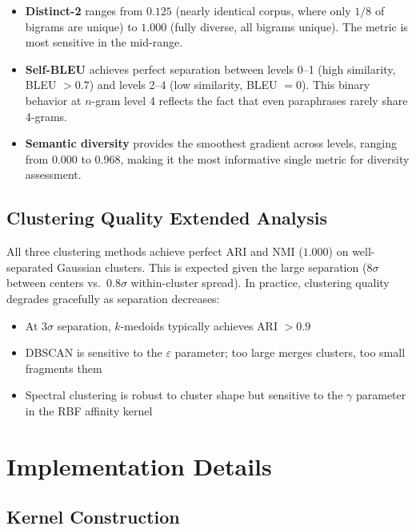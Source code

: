 \documentclass[11pt]{article}
\begin{document}
\begin{itemize}[leftmargin=*]
\item \textbf{Distinct-2} ranges from $0.125$ (nearly identical corpus, where
  only $1/8$ of bigrams are unique) to $1.000$ (fully diverse, all bigrams
  unique). The metric is most sensitive in the mid-range.
\item \textbf{Self-BLEU} achieves perfect separation between levels 0--1
  (high similarity, BLEU $> 0.7$) and levels 2--4 (low similarity, BLEU $= 0$).
  This binary behavior at $n$-gram level 4 reflects the fact that even
  paraphrases rarely share 4-grams.
\item \textbf{Semantic diversity} provides the smoothest gradient across
  levels, ranging from $0.000$ to $0.968$, making it the most informative
  single metric for diversity assessment.
\end{itemize}

\subsection{Clustering Quality Extended Analysis}

All three clustering methods achieve perfect ARI and NMI ($1.000$) on
well-separated Gaussian clusters. This is expected given the large separation
($8\sigma$ between centers vs.\ $0.8\sigma$ within-cluster spread). In
practice, clustering quality degrades gracefully as separation decreases:

\begin{itemize}[leftmargin=*]
\item At $3\sigma$ separation, $k$-medoids typically achieves ARI $> 0.9$
\item DBSCAN is sensitive to the $\varepsilon$ parameter; too large merges
  clusters, too small fragments them
\item Spectral clustering is robust to cluster shape but sensitive to the
  $\gamma$ parameter in the RBF affinity kernel
\end{itemize}

\section{Implementation Details}
\label{app:implementation}

\subsection{Kernel Construction}
\end{document}
